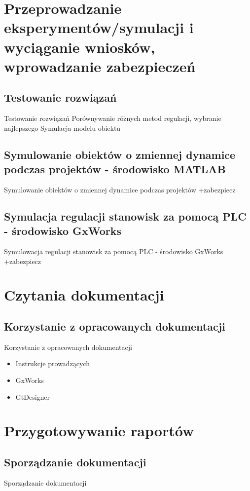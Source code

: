 \documentclass{beamer}
\begin{document}
\section{Przeprowadzanie eksperymentów/symulacji i wyciąganie wniosków, wprowadzanie zabezpieczeń}

	\subsection{Testowanie rozwiązań}
	\begin{frame}{Testowanie rozwiązań}
		Porównywanie różnych metod regulacji, wybranie najlepszego
		Symulacja modelu obiektu
	\end{frame}

	\subsection{Symulowanie obiektów o zmiennej dynamice podczas projektów - środowisko MATLAB}
	\begin{frame}{Symulowanie obiektów o zmiennej dynamice podczas projektów}
		+zabezpiecz
	\end{frame}
	
	\subsection{Symulacja regulacji stanowisk za pomocą PLC - środowisko GxWorks}
	\begin{frame}{Symulowacja regulacji stanowisk za pomocą PLC - środowisko GxWorks}
		+zabezpiecz
	\end{frame}

\section{Czytania dokumentacji}

\subsection{Korzystanie z opracowanych dokumentacji}
\begin{frame}{Korzystanie z opracowanych dokumentacji}
	\begin{itemize}
		\item Instrukcje prowadzących
		\item GxWorks
		\item GtDesigner
	\end{itemize}
\end{frame}

\section{Przygotowywanie raportów}

	\subsection{Sporządzanie dokumentacji}
	\begin{frame}{Sporządzanie dokumentacji}
		
	\end{frame}
\end{document}
